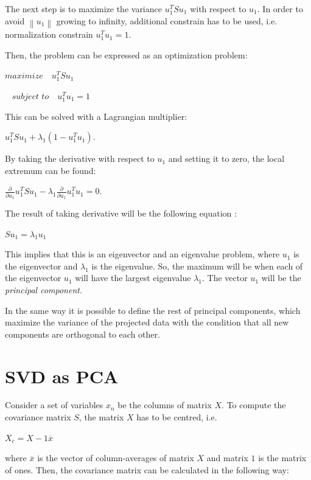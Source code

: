 The next step is to maximize the variance $u_{1}^TSu_{1}$ with respect to $u_{1}$. In order to avoid $\left \| u_{1} \right \|$ growing to infinity, additional constrain has to be used,
i.e.  normalization constrain $u_{1}^Tu_{1}=1$.

Then, the problem can be expressed as an optimization problem:

{\centering$maximize\,\,\,\,\,\,u_{1}^TSu_{1}$\\}

{\centering$\,\,\,\,\,subject \,\,to \,\,\,\,\,\,u_{1}^Tu_{1}=1$\\}

This can be solved with a Lagrangian multiplier:

{\centering$u_{1}^TSu_{1}+\lambda_{1}(1-u_{1}^Tu_{1}).$\\}

By taking the derivative with respect to $u_{1}$ and setting it to zero, the local extremum can be found:

{\centering$\frac{\partial }{\partial u_{1}}u_{1}^TSu_{1}-\lambda_{1}\frac{\partial }{\partial u_{1}}u_{1}^Tu_{1}=0.$\\}

The result of taking derivative will be the following equation \cite{Bishop}:

{\centering$Su_{1}=\lambda_{1}u_{1}$\\}

This implies that this is an eigenvector and an eigenvalue problem, where $u_{1}$ is the eigenvector and $\lambda_{1}$ is the eigenvalue.
So, the maximum will be when each of the eigenvector $u_{1}$ will have the largest eigenvalue $\lambda_{1}$. 
The vector $u_{1}$ will be the \emph{principal component}.

In the same way it is possible to define the rest of principal components, 
which maximize the variance of the projected data with the condition that all new components are orthogonal to each other.


 \section{SVD as PCA}
\label{section:svd}
Consider a set of variables $x_{n}$ be the columns of matrix $X$. To compute the covariance matrix $S$, the matrix $X$ has to be centred, i.e. 

{\centering$X_{c}=X-1\overline{x}$\\}

where $\overline{x}$ is the vector of column-averages of matrix $X$ and matrix $1$ is the matrix of ones.
Then, the covariance matrix can be calculated in the following way:

